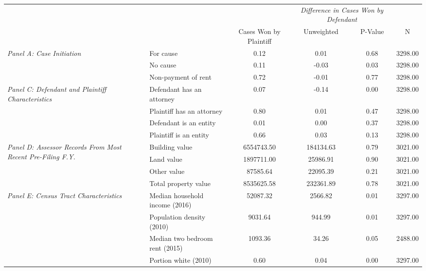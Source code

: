 \begin{tabular}{llcccc}
\toprule
 &  & \textit{} & \multicolumn{2}{|c|}{\textit{Difference in Cases Won by Defendant}} & \textit{} \\
 &  & Cases Won by Plaintiff & Unweighted & P-Value & N \\
\midrule
\multirow[c]{3}{4cm}{\textit{Panel A: Case Initiation}} & For cause & 0.12 & 0.01 & 0.68 & 3298.00 \\
 & No cause & 0.11 & -0.03 & 0.03 & 3298.00 \\
 & Non-payment of rent & 0.72 & -0.01 & 0.77 & 3298.00 \\
\cline{1-6}
\multirow[c]{4}{4cm}{\textit{Panel C: Defendant and Plaintiff Characteristics}} & Defendant has an attorney & 0.07 & -0.14 & 0.00 & 3298.00 \\
 & Plaintiff has an attorney & 0.80 & 0.01 & 0.47 & 3298.00 \\
 & Defendant is an entity & 0.01 & 0.00 & 0.37 & 3298.00 \\
 & Plaintiff is an entity & 0.66 & 0.03 & 0.13 & 3298.00 \\
\cline{1-6}
\multirow[c]{4}{4cm}{\textit{Panel D: Assessor Records From Most Recent Pre-Filing F.Y.}} & Building value & 6554743.50 & 184134.63 & 0.79 & 3021.00 \\
 & Land value & 1897711.00 & 25986.91 & 0.90 & 3021.00 \\
 & Other value & 87585.64 & 22095.39 & 0.21 & 3021.00 \\
 & Total property value & 8535625.58 & 232361.89 & 0.78 & 3021.00 \\
\cline{1-6}
\multirow[c]{4}{4cm}{\textit{Panel E: Census Tract Characteristics}} & Median household income (2016) & 52087.32 & 2566.82 & 0.01 & 3297.00 \\
 & Population density (2010) & 9031.64 & 944.99 & 0.01 & 3297.00 \\
 & Median two bedroom rent (2015) & 1093.36 & 34.26 & 0.05 & 2488.00 \\
 & Portion white (2010) & 0.60 & 0.04 & 0.00 & 3297.00 \\
\cline{1-6}
\bottomrule
\end{tabular}

